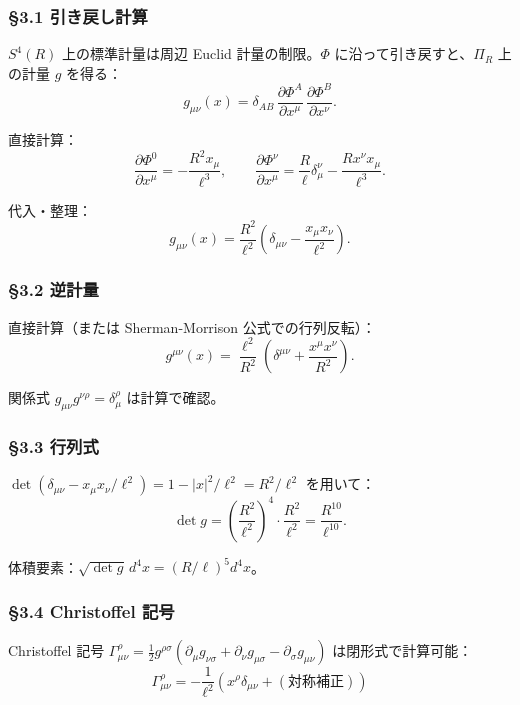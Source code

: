 \documentclass[a4paper,11pt]{ltjsarticle}
\theoremstyle{definition}
\begin{document}
\subsubsection{§3.1
引き戻し計算}\label{ux5f15ux304dux623bux3057ux8a08ux7b97}

\(S^4(R)\) 上の標準計量は周辺 Euclid 計量の制限。\(\Phi\)
に沿って引き戻すと、\(\Pi_R\) 上の計量 \(g\) を得る：
\[g_{\mu\nu}(x) = \delta_{AB}\, \frac{\partial \Phi^A}{\partial x^\mu}\, \frac{\partial \Phi^B}{\partial x^\nu}.\]

直接計算：
\[\frac{\partial \Phi^0}{\partial x^\mu} = -\frac{R^2 x_\mu}{\ell^3}, \qquad \frac{\partial \Phi^\nu}{\partial x^\mu} = \frac{R}{\ell} \delta^\nu_\mu - \frac{R x^\nu x_\mu}{\ell^3}.\]

代入・整理：
\[\boxed{\;g_{\mu\nu}(x) = \frac{R^2}{\ell^2}\left(\delta_{\mu\nu} - \frac{x_\mu x_\nu}{\ell^2}\right).\;}\]

\subsubsection{§3.2 逆計量}\label{ux9006ux8a08ux91cf}

直接計算（または Sherman-Morrison 公式での行列反転）：
\[g^{\mu\nu}(x) = \frac{\ell^2}{R^2}\left(\delta^{\mu\nu} + \frac{x^\mu x^\nu}{R^2}\right).\]

関係式 \(g_{\mu\nu} g^{\nu\rho} = \delta_\mu^\rho\) は計算で確認。

\subsubsection{§3.3 行列式}\label{ux884cux5217ux5f0f}

\(\det(\delta_{\mu\nu} - x_\mu x_\nu / \ell^2) = 1 - |x|^2/\ell^2 = R^2/\ell^2\)
を用いて：
\[\det g = \left(\frac{R^2}{\ell^2}\right)^4 \cdot \frac{R^2}{\ell^2} = \frac{R^{10}}{\ell^{10}}.\]

体積要素：\(\sqrt{\det g}\, d^4 x = (R/\ell)^5 d^4 x\)。

\subsubsection{§3.4 Christoffel 記号}\label{christoffel-ux8a18ux53f7}

Christoffel 記号
\(\Gamma^\rho_{\mu\nu} = \frac{1}{2} g^{\rho\sigma}(\partial_\mu g_{\nu\sigma} + \partial_\nu g_{\mu\sigma} - \partial_\sigma g_{\mu\nu})\)
は閉形式で計算可能：
\[\Gamma^\rho_{\mu\nu} = -\frac{1}{\ell^2}(x^\rho \delta_{\mu\nu} + (\text{対称補正}))\]
\end{document}
